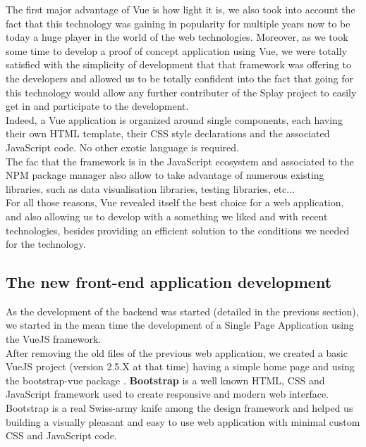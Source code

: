 \documentclass{eplmastersthesis}
\begin{document}
        The first major advantage of Vue is how light it is, we also took into
        account the fact that this technology was gaining in popularity for
        multiple years now to be today a huge player in the world of the web
        technologies. Moreover, as we took some time to develop a proof
        of concept application using Vue, we were totally satisfied with the
        simplicity of development that that framework was offering to the
        developers and allowed us to be totally confident into the fact
        that going for this technology would allow any further contributer
        of the Splay project to easily get in and participate to the
        development.\\
        Indeed, a Vue application is organized around single components, each
        having their own HTML template, their CSS style declarations and
        the associated JavaScript code. No other exotic language is required.\\
        The fac that the framework is in the JavaScript ecosystem and
        associated to the NPM package manager also allow to take advantage of
        numerous existing libraries, such as data visualisation libraries,
        testing libraries, etc... \\

        For all those reasons, Vue revealed itself the best choice for a
        web application, and also allowing us to develop with a something
        we liked and with recent technologies, besides providing an efficient
        solution to the conditions we needed for the technology.

      \subsection{The new front-end application development}

        As the development of the backend was started (detailed in the
        previous section), we started in the mean time the development of a
        Single Page Application using the VueJS framework.\\

        After removing the old files of the previous web application, we
        created a basic VueJS project (version 2.5.X at that time) having a
        simple home page and using the bootstrap-vue package
        \cite{BootstrapVue}. \textbf{Bootstrap} \cite{Bootstrap} is a well
        known HTML, CSS and JavaScript framework used to create responsive
        and modern web interface.\\
        Bootstrap is a real Swiss-army knife among the design framework
        and helped us building a visually pleasant and easy to use
        web application with minimal custom CSS and JavaScript code.\\
\end{document}
